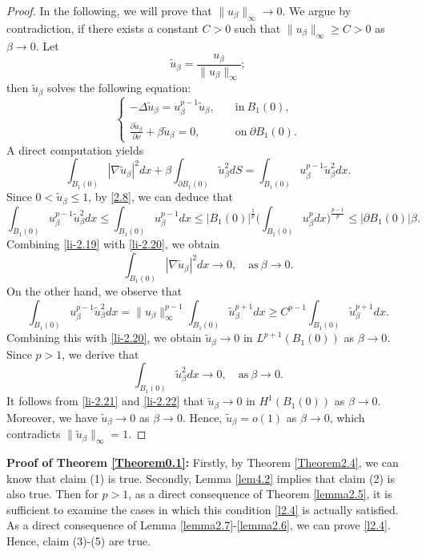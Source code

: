 \documentclass[12pt,reqno]{amsart}
\numberwithin{equation}{section}
\theoremstyle{definition}
\begin{document}
\begin{proof}
In the following, we will prove that $\|u_\beta\|_\infty\to 0$. We argue by contradiction, if there exists a constant $C>0$ such that $\|u_\beta\|_\infty\geq C>0$ as $\beta\to 0$.
Let
$$
\tilde{u}_\beta=\frac{u_\beta}{\|u_\beta\|_\infty};
$$
then $\tilde{u}_\beta$ solves the following equation:
\begin{equation}
\begin{cases}
-\Delta \tilde{u}_\beta=u_\beta^{p-1}\tilde{u}_\beta,\quad &\text{in}\ B_1(0),\\
\frac{\partial \tilde{u}_\beta}{\partial \nu}+\beta \tilde{u}_\beta=0, &\text{on}\ \partial B_1(0).
\end{cases}
\end{equation}
A direct computation yields 
\begin{equation}\label{li-2.19}
\int_{B_1(0)}|\nabla \tilde{u}_\beta|^2dx+\beta\int_{\partial B_1(0)}\tilde{u}_\beta^2dS=\int_{B_1(0)}u_\beta^{p-1}\tilde{u}_\beta^2dx.
\end{equation}
Since $0<\tilde{u}_\beta\leq 1$, by  \eqref{2.8}, we can deduce that 
\begin{equation}\label{li-2.20}
\int_{B_1(0)}u_\beta^{p-1}\tilde{u}_\beta^2dx\leq \int_{B_1(0)}u_\beta^{p-1}dx\leq |B_1(0)|^{\frac{1}{p}}\Big(\int_{B_1(0)}u_\beta^{p}dx\Big)^{\frac{p-1}{p}}\leq |\partial B_1(0)|\beta.
\end{equation}
Combining \eqref{li-2.19} with \eqref{li-2.20}, we obtain
\begin{equation}\label{li-2.21}
\int_{B_1(0)}|\nabla \tilde{u}_\beta|^2dx\to 0,\quad \text{as}\ \beta\to 0.
\end{equation}
On the other hand, we observe that 
$$
\int_{B_1(0)}u_\beta^{p-1}\tilde{u}_\beta^2dx=\|u_\beta\|_\infty^{p-1}\int_{B_1(0)}\tilde{u}_\beta^{p+1}dx\geq C^{p-1}\int_{B_1(0)}\tilde{u}_\beta^{p+1}dx.
$$
Combining this with \eqref{li-2.20}, we obtain $\tilde{u}_\beta\to 0$ in $L^{p+1}(B_1(0))$ as $\beta\to 0$. Since $p>1$, we derive that 
\begin{equation}\label{li-2.22}
\int_{B_1(0)}\tilde{u}_\beta^2dx\to 0, \quad\text{as}\  \beta\to 0. 
\end{equation}
It follows from \eqref{li-2.21} and \eqref{li-2.22} that $\tilde{u}_\beta\to 0$ in $H^{1}(B_1(0))$ as $\beta\to 0$. Moreover, we have $\tilde{u}_\beta\to 0$ as $\beta\to 0$. Hence, $\tilde{u}_\beta=o(1)$ as $\beta\to 0$, which contradicts $\|\tilde{u}_\beta\|_\infty=1$.
\end{proof}


{\bf Proof of Theorem \ref{Theorem0.1}:}  Firstly, by Theorem \ref{Theorem2.4}, we can know that claim (1) is true. Secondly,  Lemma \ref{lem4.2} implies that claim (2) is also true. Then for $p>1$, as a direct consequence of Theorem \ref{lemma2.5}, it is sufficient to examine the cases in which this condition \eqref{l2.4} is actually satisfied. 
As a direct consequence of Lemma \ref{lemma2.7}-\ref{lemma2.6}, we can prove  \eqref{l2.4}. Hence, claim (3)-(5) are true.
\end{document}
